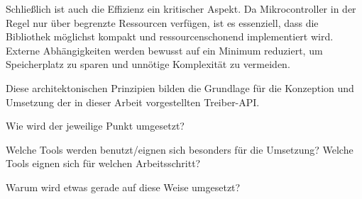 Schließlich ist auch die Effizienz ein kritischer Aspekt.
Da Mikrocontroller in der Regel nur über begrenzte Ressourcen verfügen, ist es essenziell, dass die Bibliothek möglichst kompakt und ressourcenschonend implementiert wird. 
Externe Abhängigkeiten werden bewusst auf ein Minimum reduziert, um Speicherplatz zu sparen und unnötige Komplexität zu vermeiden.

Diese architektonischen Prinzipien bilden die Grundlage für die Konzeption und Umsetzung der in dieser Arbeit vorgestellten Treiber-API.

Wie wird der jeweilige Punkt umgesetzt?

Welche Tools werden benutzt/eignen sich besonders für die Umsetzung?
Welche Tools eignen sich für welchen Arbeitsschritt?

Warum wird etwas gerade auf diese Weise umgesetzt?





























